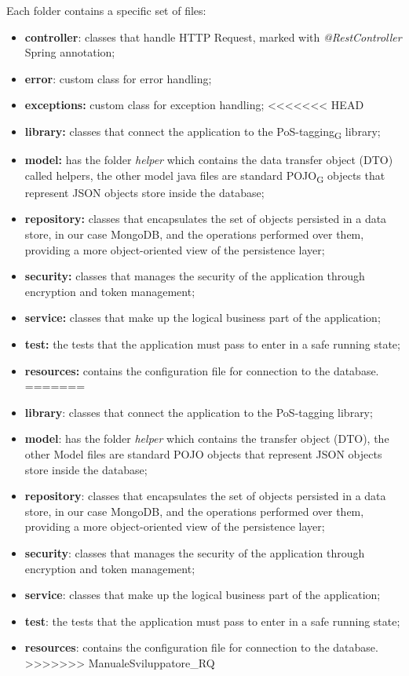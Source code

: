 Each folder contains a specific set of files:
\begin{itemize}
\item  \textbf{controller}: classes that handle HTTP Request, marked with \textit{@RestController} Spring annotation;
\item  \textbf{error}: custom class for error handling;
\item  \textbf{exceptions:} custom class for exception handling;
<<<<<<< HEAD
\item  \textbf{library:} classes that connect the application to the {PoS-tagging}\textsubscript{G} library;
\item  \textbf{model:} has the folder \textit{helper} which contains the data transfer object (DTO) called helpers, the other model java files are standard {POJO}\textsubscript{G} objects that represent JSON objects store inside the database;
\item  \textbf{repository:} classes that encapsulates the set of objects persisted in a data store, in our case MongoDB, and the operations performed over them, providing a more object-oriented view of the persistence layer;
\item  \textbf{security:} classes that manages the security of the application through encryption and token management;
\item  \textbf{service:} classes that make up the logical business part of the application;
\item  \textbf{test:}  the tests that the application must pass to enter in a safe running state;
\item \textbf{resources:} contains the configuration file for connection to the database.
=======
\item  \textbf{library}: classes that connect the application to the PoS-tagging library;
\item  \textbf{model}: has the folder \textit{helper} which contains the transfer object (DTO), the other Model files are standard POJO objects that represent JSON objects store inside the database;
\item  \textbf{repository}: classes that encapsulates the set of objects persisted in a data store, in our case MongoDB, and the operations performed over them, providing a more object-oriented view of the persistence layer;
\item  \textbf{security}: classes that manages the security of the application through encryption and token management;
\item  \textbf{service}: classes that make up the logical business part of the application;
\item  \textbf{test}: the tests that the application must pass to enter in a safe running state;
\item \textbf{resources}: contains the configuration file for connection to the database.
>>>>>>> ManualeSviluppatore_RQ
\end{itemize}

